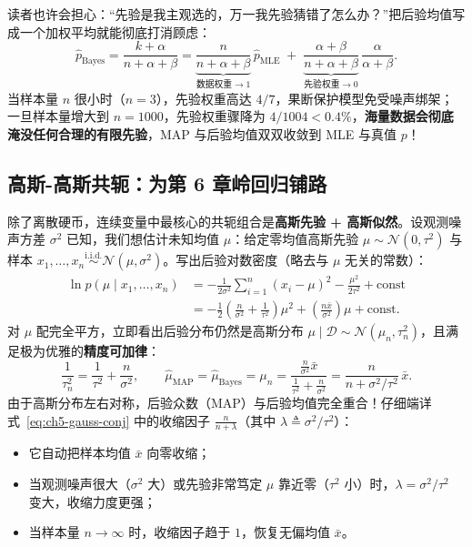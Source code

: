 读者也许会担心：“先验是我主观选的，万一我先验猜错了怎么办？”把后验均值写成一个加权平均就能彻底打消顾虑：
\[
  \hat{p}_{\text{Bayes}}
  = \frac{k + \alpha}{n + \alpha + \beta}
  = \underbrace{\frac{n}{n + \alpha + \beta}}_{\text{数据权重}\to 1}\,\hat{p}_{\text{MLE}}
  \;+\;
  \underbrace{\frac{\alpha + \beta}{n + \alpha + \beta}}_{\text{先验权重}\to 0}\,\frac{\alpha}{\alpha + \beta}.
\]
当样本量 $n$ 很小时（$n=3$），先验权重高达 $4/7$，果断保护模型免受噪声绑架；一旦样本量增大到 $n=1000$，先验权重骤降为 $4/1004 < 0.4\%$，\textbf{海量数据会彻底淹没任何合理的有限先验}，MAP 与后验均值双双收敛到 MLE 与真值 $p$！

\subsection{高斯-高斯共轭：为第 6 章岭回归铺路}
\label{subsec:ch5-gauss-gauss}

除了离散硬币，连续变量中最核心的共轭组合是\textbf{高斯先验 + 高斯似然}。设观测噪声方差 $\sigma^2$ 已知，我们想估计未知均值 $\mu$：给定零均值高斯先验 $\mu \sim \mathcal{N}(0, \tau^2)$ 与样本 $x_1, \dots, x_n \stackrel{\text{i.i.d.}}{\sim} \mathcal{N}(\mu, \sigma^2)$。写出后验对数密度（略去与 $\mu$ 无关的常数）：
\begin{align*}
  \ln p(\mu \mid x_1, \dots, x_n)
  &= -\frac{1}{2\sigma^2}\sum_{i=1}^n (x_i - \mu)^2 - \frac{\mu^2}{2\tau^2} + \text{const} \\
  &= -\frac{1}{2}\left(\frac{n}{\sigma^2} + \frac{1}{\tau^2}\right)\mu^2 + \left(\frac{n\bar{x}}{\sigma^2}\right)\mu + \text{const}.
\end{align*}
对 $\mu$ 配完全平方，立即看出后验分布仍然是高斯分布 $\mu \mid \mathcal{D} \sim \mathcal{N}(\mu_n, \tau_n^2)$，且满足极为优雅的\textbf{精度可加律}：
\begin{equation}
  \frac{1}{\tau_n^2} = \frac{1}{\tau^2} + \frac{n}{\sigma^2},
  \qquad
  \hat{\mu}_{\text{MAP}} = \hat{\mu}_{\text{Bayes}} = \mu_n
  = \frac{\frac{n}{\sigma^2}\bar{x}}{\frac{1}{\tau^2} + \frac{n}{\sigma^2}}
  = \frac{n}{n + \sigma^2/\tau^2}\,\bar{x}.
  \label{eq:ch5-gauss-conj}
\end{equation}
由于高斯分布左右对称，后验众数（MAP）与后验均值完全重合！仔细端详式~\eqref{eq:ch5-gauss-conj} 中的收缩因子 $\frac{n}{n + \lambda}$（其中 $\lambda \triangleq \sigma^2/\tau^2$）：
\begin{itemize}
  \item 它自动把样本均值 $\bar{x}$ 向零收缩；
  \item 当观测噪声很大（$\sigma^2$ 大）或先验非常笃定 $\mu$ 靠近零（$\tau^2$ 小）时，$\lambda = \sigma^2/\tau^2$ 变大，收缩力度更强；
  \item 当样本量 $n \to \infty$ 时，收缩因子趋于 $1$，恢复无偏均值 $\bar{x}$。
\end{itemize}

